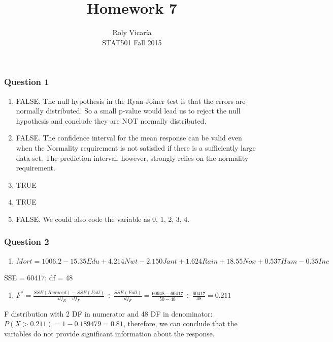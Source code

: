\documentclass{article}
\title{Homework 7}
\author{Roly Vicar\'ia \\ STAT501 Fall 2015}
\providecommand{\tightlist}{%
      \setlength{\itemsep}{0pt}\setlength{\parskip}{0pt}}
\begin{document}
    
    
    \maketitle
    
    

    
    \subsubsection{Question 1}\label{question-1}

\begin{enumerate}
\def\labelenumi{\alph{enumi})}
\item
  FALSE. The null hypothesis in the Ryan-Joiner test is that the errors
  are normally distributed. So a small p-value would lead us to reject
  the null hypothesis and conclude they are NOT normally distributed.
\item
  FALSE. The confidence interval for the mean response can be valid even
  when the Normality requirement is not satisfied if there is a
  sufficiently large data set. The prediction interval, however,
  strongly relies on the normality requirement.
\item
  TRUE
\item
  TRUE
\item
  FALSE. We could also code the variable as 0, 1, 2, 3, 4.
\end{enumerate}

    \subsubsection{Question 2}\label{question-2}

\begin{enumerate}
\def\labelenumi{\alph{enumi})}
\tightlist
\item
  \(Mort = 1006.2 - 15.35 Edu + 4.214 Nwt - 2.150 Jant + 1.624 Rain + 18.55 Nox + 0.537 Hum - 0.35 Inc\)
\end{enumerate}

SSE = 60417; df = 48

\begin{enumerate}
\def\labelenumi{\alph{enumi})}
\setcounter{enumi}{1}
\tightlist
\item
  \(F^* = \frac{SSE(Reduced) - SSE(Full)}{df_R - df_F} \div \frac{SSE(Full)}{df_F} = \frac{60948 - 60417}{50-48} \div \frac{60417}{48} = 0.211\)
\end{enumerate}

F distribution with 2 DF in numerator and 48 DF in denominator:
\(P(X > 0.211) = 1 - 0.189479 = 0.81\), therefore, we can conclude that
the variables do not provide significant information about the response.
\end{document}
